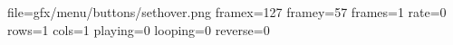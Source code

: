 file=gfx/menu/buttons/sethover.png
framex=127
framey=57
frames=1
rate=0
rows=1
cols=1
playing=0
looping=0
reverse=0
